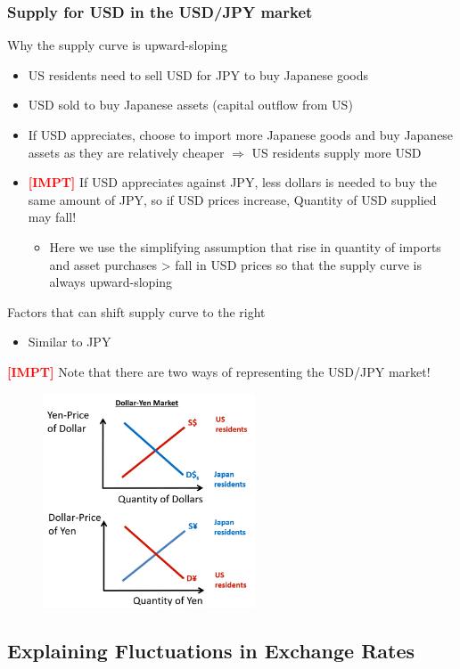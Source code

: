 \documentclass{article}
\newcommand{\impt}[0]{\textcolor{red}{\textbf{[IMPT] }}}
\begin{document}
\begin{multicols}{2}
\subsubsection{Supply for USD in the USD/JPY market}
Why the supply curve is upward-sloping
\begin{itemize}
	\item US residents need to sell USD for JPY to buy Japanese goods
	\item USD sold to buy Japanese assets (capital outflow from US)
	\item If USD appreciates, choose to import more Japanese goods and buy Japanese assets as they are relatively cheaper $\Rightarrow$ US residents supply more USD
	\item \impt If USD appreciates against JPY, less dollars is needed to buy the same amount of JPY, so if USD prices increase, Quantity of USD supplied may fall!
	\begin{itemize}
		\item Here we use the simplifying assumption that rise in quantity of imports and asset purchases > fall in USD prices so that the supply curve is always upward-sloping
	\end{itemize}
\end{itemize}
Factors that can shift supply curve to the right
\begin{itemize}
	\item Similar to JPY
\end{itemize}
\impt Note that there are two ways of representing the USD/JPY market!
\begin{figure}[H]
	\centering
	\includegraphics[width=17em]{images/exchangerates.png}
\end{figure}
\subsection{Explaining Fluctuations in Exchange Rates}

\end{multicols}
\end{document}
